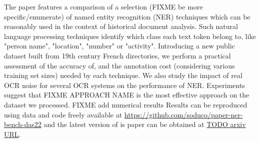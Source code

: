 The paper features a comparison of a selection (FIXME be more specific/enumerate) of named entity recognition (NER) techniques which can be reasonably used in the context of historical document analysis.
Such natural language processing techniques identify which class each text token belong to, like "person name", "location", "number" or "activity".
Introducing a new public dataset built from 19th century French directories, 
we perform a practical assessment of the accuracy of, and the annotation cost (considering various training set sizes) needed by each technique.
We also study the impact of real OCR noise for several OCR systems on the performance of NER.
Experiments suggest that FIXME APPROACH NAME is the most effective approach on the dataset we processed.
FIXME add numerical results
Results can be reproduced using data and code freely available at \url{https://github.com/soduco/paper-ner-bench-das22}
and the latest version of is paper can be obtained at \url{TODO arxiv URL}.